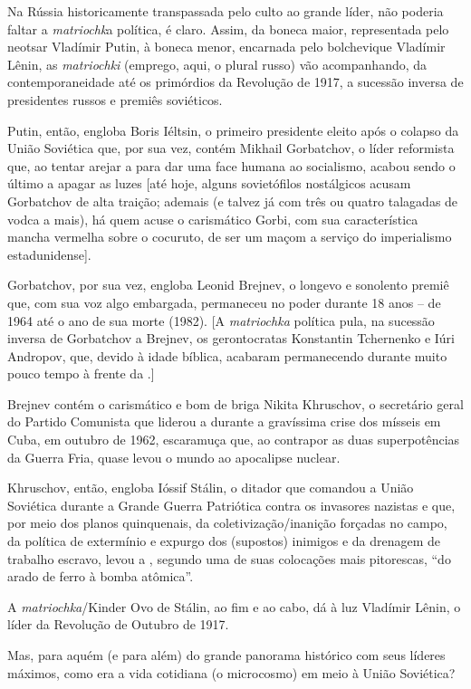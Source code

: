 Na Rússia historicamente transpassada pelo culto ao grande líder, não
poderia faltar a \emph{matriochk}a política, é claro. Assim, da boneca
maior, representada pelo neotsar Vladímir Putin, à boneca menor,
encarnada pelo bolchevique Vladímir Lênin, as \emph{matriochki}
(emprego, aqui, o plural russo) vão acompanhando, da contemporaneidade
até os primórdios da Revolução de 1917, a sucessão inversa de
presidentes russos e premiês soviéticos.

Putin, então, engloba Boris Iéltsin, o primeiro presidente eleito após o
colapso da União Soviética que, por sua vez, contém Mikhail Gorbatchov,
o líder reformista que, ao tentar arejar a  para dar uma face humana
ao socialismo, acabou sendo o último a apagar as luzes {[}até hoje,
alguns sovietófilos nostálgicos acusam Gorbatchov de alta traição;
ademais (e talvez já com três ou quatro talagadas de vodca a mais), há
quem acuse o carismático Gorbi, com sua característica mancha vermelha
sobre o cocuruto, de ser um maçom a serviço do imperialismo
estadunidense{]}.

Gorbatchov, por sua vez, engloba Leonid Brejnev, o longevo e sonolento
premiê que, com sua voz algo embargada, permaneceu no poder durante 18
anos -- de 1964 até o ano de sua morte (1982). {[}A \emph{matriochka}
política pula, na sucessão inversa de Gorbatchov a Brejnev, os
gerontocratas Konstantin Tchernenko e Iúri Andropov, que, devido à idade
bíblica, acabaram permanecendo durante muito pouco tempo à frente da
.{]}

Brejnev contém o carismático e bom de briga Nikita Khruschov, o
secretário geral do Partido Comunista que liderou a  durante a
gravíssima crise dos mísseis em Cuba, em outubro de 1962, escaramuça
que, ao contrapor as duas superpotências da Guerra Fria, quase levou o
mundo ao apocalipse nuclear.

Khruschov, então, engloba Ióssif Stálin, o ditador que comandou a União
Soviética durante a Grande Guerra Patriótica contra os invasores
nazistas e que, por meio dos planos quinquenais, da
coletivização/inanição forçadas no campo, da política de extermínio e
expurgo dos (supostos) inimigos e da drenagem de trabalho escravo, levou
a , segundo uma de suas colocações mais pitorescas, ``do arado de
ferro à bomba atômica''.

A \emph{matriochka}/Kinder Ovo de Stálin, ao fim e ao cabo, dá à luz
Vladímir Lênin, o líder da Revolução de Outubro de 1917.

Mas, para aquém (e para além) do grande panorama histórico com seus
líderes máximos, como era a vida cotidiana (o microcosmo) em meio à
União Soviética?

